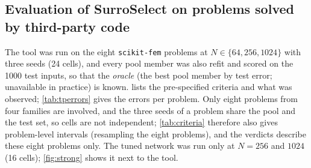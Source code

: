 \subsection{Evaluation of SurroSelect on problems solved by third-party code}\label{sec:results-tool}
The tool was run on the eight \texttt{scikit-fem} problems at $N\in\{64,256,1024\}$ with three seeds (24 cells), and every pool member was also refit and scored on the 1000 test inputs, so that the \emph{oracle} (the best pool member by test error; unavailable in practice) is known.  lists the pre-specified criteria and what was observed; \cref{tab:tperrors} gives the errors per problem. Only eight problems from four families are involved, and the three seeds of a problem share the pool and the test set, so cells are not independent; \cref{tab:criteria} therefore also gives problem-level intervals (resampling the eight problems), and the verdicts describe these eight problems only. The tuned network was run only at $N=256$ and $1024$ (16 cells); \cref{fig:strong} shows it next to the tool.
\begin{table}[t]\centering\caption{Pre-specified criteria (\cref{tab:hyp}) and results on the eight problems solved by third-party code. Intervals are 95\% (bootstrap for medians, Wilson for proportions, both treating cells as independent); problem-level intervals are in the text. The Holm-adjusted $p$-values are one-sided exact binomial tests against the thresholds.}\label{tab:criteria}\footnotesize\resizebox{\textwidth}{!}{}\end{table}
